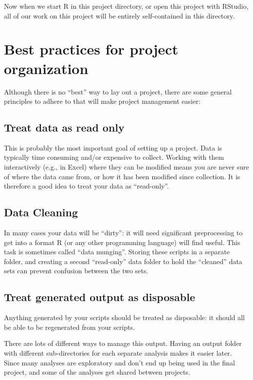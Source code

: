 \documentclass[]{book}
\begin{document}
Now when we start R in this project directory, or open this project with
RStudio, all of our work on this project will be entirely self-contained
in this directory.

\section{Best practices for project
organization}\label{best-practices-for-project-organization}

Although there is no ``best'' way to lay out a project, there are some
general principles to adhere to that will make project management
easier:

\subsection{Treat data as read only}\label{treat-data-as-read-only}

This is probably the most important goal of setting up a project. Data
is typically time consuming and/or expensive to collect. Working with
them interactively (e.g., in Excel) where they can be modified means you
are never sure of where the data came from, or how it has been modified
since collection. It is therefore a good idea to treat your data as
``read-only''.

\subsection{Data Cleaning}\label{data-cleaning}

In many cases your data will be ``dirty'': it will need significant
preprocessing to get into a format R (or any other programming language)
will find useful. This task is sometimes called ``data munging''.
Storing these scripts in a separate folder, and creating a second
``read-only'' data folder to hold the ``cleaned'' data sets can prevent
confusion between the two sets.

\subsection{Treat generated output as
disposable}\label{treat-generated-output-as-disposable}

Anything generated by your scripts should be treated as disposable: it
should all be able to be regenerated from your scripts.

There are lots of different ways to manage this output. Having an output
folder with different sub-directories for each separate analysis makes
it easier later. Since many analyses are exploratory and don't end up
being used in the final project, and some of the analyses get shared
between projects.
\end{document}
